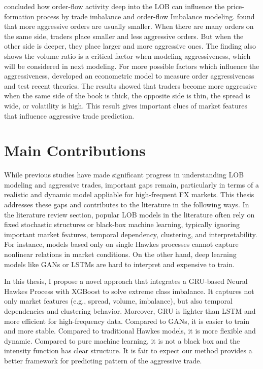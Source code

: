 \cite{xu2019multilevelorderflowimbalancelimit} concluded how order-flow activity deep into the LOB can influence the price-formation process by trade imbalance and order-flow Imbalance modeling. \cite{OrderAggressiveness2010} found that more aggressive orders are usually smaller. When there are many orders on the same side, traders place smaller and less aggressive orders. But when the other side is deeper, they place larger and more aggressive ones. The finding also shows the volume ratio is a critical factor when modeling aggressiveness, which will be considered in next modeling. For more possible factors which influence the aggressiveness, \cite{RANALDO200453} developed an econometric model to measure order aggressiveness and test recent theories. The results showed that traders become more aggressive when the same side of the book is thick, the opposite side is thin, the spread is wide, or volatility is high. This result gives important clues of market features that influence aggressive trade prediction.


\section{Main Contributions} \label{sec:maincontributions}
While previous studies have made significant progress in understanding LOB modeling and aggressive trades, important gaps remain, particularly in terms of a realistic and dynamic model appliable for high-frequent FX markets. This thesis addresses these gaps and contributes to the literature in the following ways. In the literature review section, popular LOB models in the literature often rely on fixed stochastic structures or black-box machine learning, typically ignoring important market features, temporal dependency, clustering, and interpretability. For instance, models based only on single Hawkes processes cannot capture nonlinear relations in market conditions. On the other hand, deep learning models like GANs or LSTMs are hard to interpret and expensive to train.

In this thesis, I propose a novel approach that integrates a GRU-based Neural Hawkes Process with XGBoost to solve extreme class imbalance. It captures not only market features (e.g., spread, volume, imbalance), but also temporal dependencies and clustering behavior. Moreover, GRU is lighter than LSTM and more efficient for high-frequency data. Compared to GANs, it is easier to train and more stable. Compared to traditional Hawkes models, it is more flexible and dynamic. Compared to pure machine learning, it is not a black box and the intensity function has clear structure. It is fair to expect our method provides a better framework for predicting pattern of the aggressive trade.

